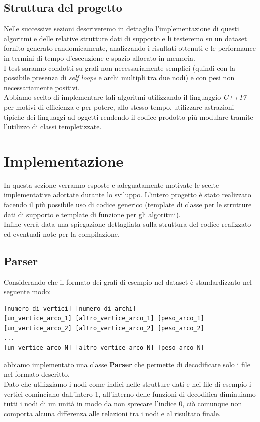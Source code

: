 \documentclass[]{article}
\begin{document}
\subsection{Struttura del progetto}
Nelle successive sezioni descriveremo in dettaglio l'implementazione di questi algoritmi e delle relative strutture dati di supporto e li testeremo su un dataset fornito generato randomicamente, analizzando i risultati ottenuti e le performance in termini di tempo d'esecuzione e spazio allocato in memoria.\\
I test saranno condotti su grafi non necessariamente semplici (quindi con la possibile presenza di \textit{self loops} e archi multipli tra due nodi) e con pesi non necessariamente positivi.\\
Abbiamo scelto di implementare tali algoritmi utilizzando il linguaggio \textit{C++17} per motivi di efficienza e per potere, allo stesso tempo, utilizzare astrazioni tipiche dei linguaggi ad oggetti rendendo il codice prodotto più modulare tramite l'utilizzo di classi templetizzate.
\section{Implementazione}
In questa sezione verranno esposte e adeguatamente motivate le scelte implementative adottate durante lo sviluppo. L'intero progetto è stato realizzato facendo il più possibile uso di codice generico (template di classe per le strutture dati di supporto e template di funzione per gli algoritmi).\\
Infine verrà data una spiegazione dettagliata sulla struttura del codice realizzato ed eventuali note per la compilazione.
\subsection{Parser}
Considerando che il formato dei grafi di esempio nel dataset è standardizzato nel seguente modo:
\begin{verbatim}
[numero_di_vertici] [numero_di_archi] 
[un_vertice_arco_1] [altro_vertice_arco_1] [peso_arco_1] 
[un_vertice_arco_2] [altro_vertice_arco_2] [peso_arco_2] 
... 
[un_vertice_arco_N] [altro_vertice_arco_N] [peso_arco_N]
\end{verbatim}
abbiamo implementato una classe \textbf{Parser} che permette di decodificare solo i file nel formato descritto.\\
Dato che utilizziamo i nodi come indici nelle strutture dati e nei file di esempio i vertici cominciano dall'intero 1, all'interno delle funzioni di decodifica diminuiamo tutti i nodi di un unità in modo da non sprecare l'indice 0, ciò comunque non comporta alcuna differenza alle relazioni tra i nodi e al risultato finale.
\end{document}
